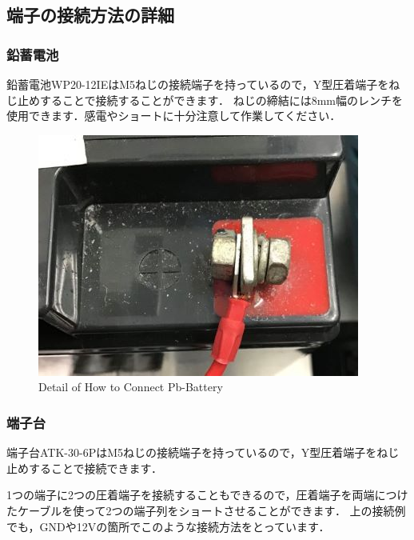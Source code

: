 \documentclass[{../../master}]{subfiles}
\begin{document}
  \subsection{端子の接続方法の詳細}

  \subsubsection{鉛蓄電池}
  鉛蓄電池WP20-12IEはM5ねじの接続端子を持っているので，Y型圧着端子をねじ止めすることで接続することができます．  
  ねじの締結には8mm幅のレンチを使用できます．感電やショートに十分注意して作業してください．

  \begin{figure}[ht]
    \centering
    \includegraphics[width=65truemm, clip]{images/pb_battery.jpg}
    \caption{Detail of How to Connect Pb-Battery}
    \label{fig:pb_battery}
  \end{figure}

  \subsubsection{端子台}
  端子台ATK-30-6PはM5ねじの接続端子を持っているので，Y型圧着端子をねじ止めすることで接続できます．

  1つの端子に2つの圧着端子を接続することもできるので，圧着端子を両端につけたケーブルを使って2つの端子列をショートさせることができます．
  上の接続例でも，GNDや12Vの箇所でこのような接続方法をとっています．
\end{document}
